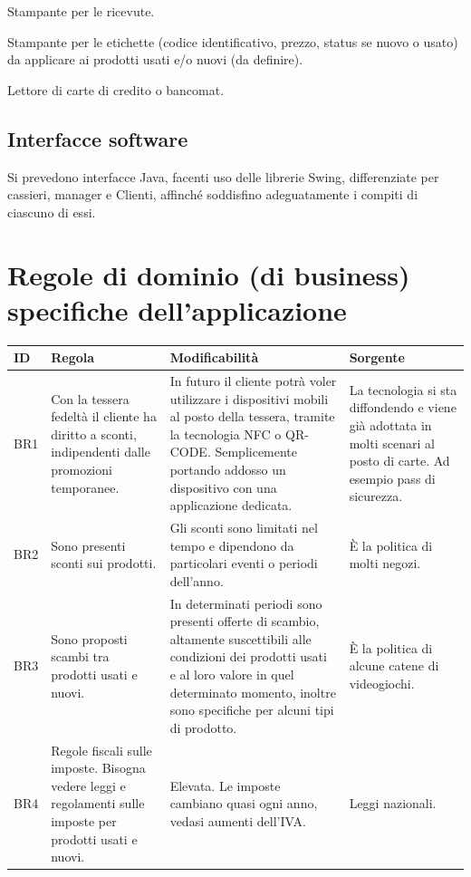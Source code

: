 \documentclass[a4paper,10pt]{report}
\begin{document}
Stampante per le ricevute.

Stampante per le etichette (codice identificativo, prezzo, status se nuovo o usato) da applicare ai prodotti usati e/o nuovi (da definire).

Lettore di carte di credito o bancomat.

 \subsection*{Interfacce software}
Si prevedono interfacce Java, facenti uso delle librerie Swing, differenziate per cassieri, manager e Clienti, affinché soddisfino adeguatamente i compiti di ciascuno di essi.
 
 \section*{Regole di dominio (di business) specifiche dell'applicazione}
 \begin{tabular}{|p{}|p{}|p{}|p{}|}
 \hline
  \textbf{ID} & \textbf{Regola} & \textbf{Modificabilità} & \textbf{Sorgente} \\
  \hline
  BR1 &
  Con la tessera fedeltà il cliente ha diritto a sconti, indipendenti dalle promozioni temporanee. &
  In futuro il cliente potrà voler utilizzare i dispositivi mobili al posto della tessera, tramite la tecnologia NFC o QR-CODE. Semplicemente portando addosso un dispositivo con una applicazione dedicata. &
  La tecnologia si sta diffondendo e viene già adottata in molti scenari al posto di carte. Ad esempio pass di sicurezza.\\
  \hline
  BR2 & 
  Sono presenti sconti sui prodotti. &
  Gli sconti sono limitati nel tempo e dipendono da particolari eventi o periodi dell'anno. &
  È la politica di molti negozi.\\
  \hline
  BR3 &
  Sono proposti scambi tra prodotti usati e nuovi. &
  In determinati periodi sono presenti offerte di scambio, altamente suscettibili alle condizioni dei prodotti usati e al loro valore in quel determinato momento, inoltre sono specifiche per alcuni tipi di prodotto. &
  È la politica di alcune catene di videogiochi. \\
  \hline
  BR4 &
  Regole fiscali sulle imposte. Bisogna vedere leggi e regolamenti sulle imposte per prodotti usati e nuovi. &
  Elevata. Le imposte cambiano quasi ogni anno, vedasi aumenti dell'IVA. &
  Leggi nazionali.\\
  \hline
 \end{tabular}
\end{document}
